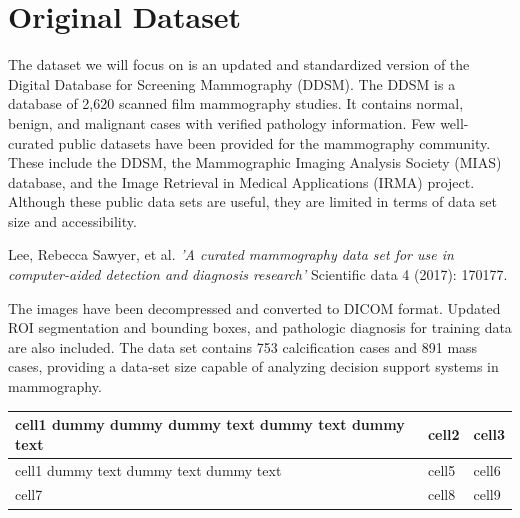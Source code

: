 \documentclass{book}
\begin{document}
    \section{Original Dataset}
        The dataset we will focus on is an updated and standardized version of the Digital Database for Screening Mammography (DDSM). The DDSM is a database of 2,620 scanned film mammography studies. It contains normal, benign, and malignant cases with verified pathology information. Few well-curated public datasets have been provided for the mammography community. These include the DDSM, the Mammographic Imaging Analysis Society (MIAS) database, and the Image Retrieval in Medical Applications (IRMA) project. Although these public data sets are useful, they are limited in terms of data set size and accessibility.

        \begin{center}
            \begin{minipage}{0.9\linewidth}
                \vspace{5pt}%
                {\small
                    Lee, Rebecca Sawyer, et al. \textit{'A curated mammography data set for use in computer-aided detection and diagnosis research'} Scientific data 4 (2017): 170177.
                }
                \vspace{5pt}%
            \end{minipage}
        \end{center}

        The images have been decompressed and converted to DICOM format. Updated ROI segmentation and bounding boxes, and pathologic diagnosis for training data are also included. The data set contains 753 calcification cases and 891 mass cases, providing a data-set size capable of analyzing decision support systems in mammography.

        
        \begin{center}
            \begin{tabular}{ | m{5em} | m{1cm}| m{1cm} | } 
            \hline
            cell1 dummy dummy dummy text dummy text dummy text& cell2 & cell3 \\ 
            \hline
            cell1 dummy text dummy text dummy text & cell5 & cell6 \\ 
            \hline
            cell7 & cell8 & cell9 \\ 
            \hline
            \end{tabular}
        \end{center}
    
\end{document}
